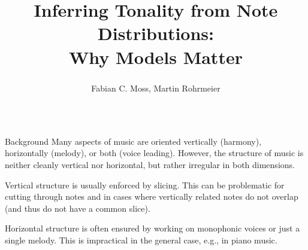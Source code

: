\documentclass[final]{beamer}
\title{Inferring Tonality from Note Distributions: \\ Why Models Matter}
\author{Fabian C. Moss\textsuperscript{\textasteriskcentered}, Martin Rohrmeier}
\institute{Digital and Cognitive Musicology Lab, École Polytechnique Fédérale de Lausanne}
\newcommand*{\pianoroll}{
  \draw (0,2) rectangle (1,2.4);
  \draw (1,2.4) rectangle (2,2.8);
  \draw (2,2) rectangle (2.5,2.4);
  \draw (2.5,1.6) rectangle (3,2);
  \draw (3,1.2) rectangle (3.5,1.6);
  \draw (3.5,0.8) rectangle (4,1.2);

  \draw (4,1.6) rectangle (5,2);
  \draw (5,2) rectangle (6,2.4);
  \draw (6,1.6) rectangle (6.5,2);
  \draw (6.5,1.2) rectangle (7,1.6);
  \draw (7,0.8) rectangle (7.5,1.2);
  \draw (7.5,0.4) rectangle (8,0.8);

  \draw (1,-0.4) rectangle (2,0);
  \draw (2,0) rectangle (4,0.4);
  \draw (5,-0.8) rectangle (6,-0.4);
  \draw (6,-0.4) rectangle (8,0);
}
\begin{document}
\begin{frame}[t]

  \begin{columns}[t]
    \begin{column}{0.3\textwidth}
      \begin{block}{Background}
        Many aspects of music are oriented \alert{vertically}
        (harmony), \alert{horizontally} (melody), or both (voice
        leading).  However, the structure of music is neither cleanly
        vertical nor horizontal, but rather irregular in both
        dimensions.

        \begin{adjustbox}{scale=2.7,center,margin=0 1ex}
        \end{adjustbox}

        Vertical structure is usually enforced by \alert{slicing}.
        This can be problematic for cutting through notes and in cases
        where vertically related notes do not overlap (and thus do not
        have a common slice).

        \begin{adjustbox}{scale=2.7,center,margin=0 1ex}
        \end{adjustbox}

        Horizontal structure is often ensured by working on
        \alert{monophonic voices} or just a single \alert{melody}.
        This is impractical in the general case, e.g., in piano music.

        \begin{adjustbox}{scale=2.7,center,margin=0 1ex}
        \end{adjustbox}


\end{block}
\end{column}
\end{columns}
\end{frame}
\end{document}
